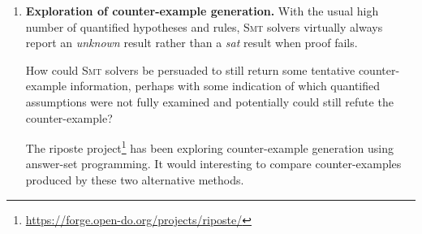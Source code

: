 \documentclass[12pt,fleqn]{article}
\newcommand{\smt}{\textsc{Smt}}
\begin{document}
\begin{enumerate}
\item \textbf{Exploration of counter-example generation.}  With the
  usual high number of quantified hypotheses and rules, \smt{} solvers
  virtually always report an \emph{unknown} result rather than a
  \emph{sat} result when proof fails.

  How could \smt{} solvers be persuaded to still return some tentative
  counter-example information, perhaps with some indication of which
  quantified assumptions were not fully examined and potentially could
  still refute the counter-example?

  The riposte
  project\footnote{\url{https://forge.open-do.org/projects/riposte/}}
  has been exploring counter-example generation using answer-set
  programming.  It would interesting to compare counter-examples
  produced by these two alternative methods.

\end{enumerate}
\end{document}
